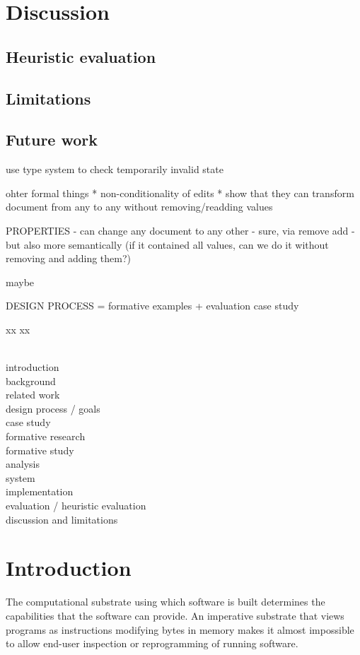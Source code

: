 \documentclass[sigconf]{acmart}
\begin{document}
\section{Discussion}
\subsection{Heuristic evaluation}
\subsection{Limitations}
\subsection{Future work}
\label{sec:discuss-future}
use type system to check temporarily invalid state

ohter formal things
* non-conditionality of edits
* show that they can transform document from any to any without removing/readding values


PROPERTIES
- can change any document to any other - sure, via remove add - but also more semantically
(if it contained all values, can we do it without removing and adding them?)

maybe


DESIGN PROCESS = formative examples + evaluation case study

xx
\newpage
xx

~\\
introduction \\
background \\
related work \\
design process / goals \\
case study \\
formative research \\
formative study \\
analysis \\
system \\
implementation \\
evaluation / heuristic evaluation \\
discussion and limitations \\

\newpage

\section{Introduction}

The computational substrate using which software is built determines the capabilities that the
software can provide. An imperative substrate that views programs as instructions modifying
bytes in memory makes it almost impossible to allow end-user inspection or reprogramming of
running software.
\end{document}

